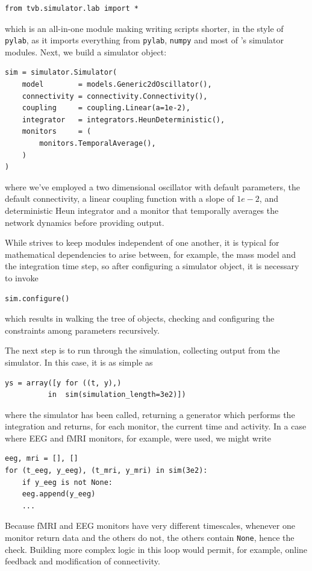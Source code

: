 \begin{lstlisting}
from tvb.simulator.lab import *
\end{lstlisting}

\noindent which is an all-in-one module making writing scripts
shorter, in the style of \texttt{pylab}, as it imports everything
from \texttt{pylab}, \texttt{numpy} and most of \TVB's simulator
modules. Next, we build a simulator object:

\begin{lstlisting}
sim = simulator.Simulator(
    model        = models.Generic2dOscillator(), 
    connectivity = connectivity.Connectivity(),
    coupling     = coupling.Linear(a=1e-2),
    integrator   = integrators.HeunDeterministic(),
    monitors     = (
        monitors.TemporalAverage(), 
    )
)
\end{lstlisting}

\noindent where we've employed a two dimensional oscillator
with default parameters, the default connectivity, a linear 
coupling function with a slope of $1e-2$, and deterministic
Heun integrator and a monitor that temporally averages the 
network dynamics before providing output.

While \TVB strives to keep modules independent of one another,
it is typical for mathematical dependencies to arise between, 
for example, the mass model and the integration time step, so
after configuring a simulator object, it is necessary to invoke

\begin{lstlisting}
sim.configure()
\end{lstlisting}

which results in walking the tree of objects, checking and 
configuring the constraints among parameters recursively.

The next step is to run through the simulation, collecting
output from the simulator. In this case, it is as simple as
\begin{lstlisting}
ys = array([y for ((t, y),) 
	      in  sim(simulation_length=3e2)])
\end{lstlisting}
\noindent where the simulator has been called, returning a 
generator which performs the integration and returns, for each
monitor, the current time and activity. In a case where EEG 
and fMRI monitors, for example, were used, we might write
\begin{lstlisting}
eeg, mri = [], []
for (t_eeg, y_eeg), (t_mri, y_mri) in sim(3e2):
    if y_eeg is not None:
	eeg.append(y_eeg)
    ...
\end{lstlisting}
\noindent Because fMRI and EEG monitors have very different
timescales, whenever one monitor return data and the others do
not, the others contain \texttt{None}, hence the check. Building
more complex logic in this loop would permit, for example, online
feedback and modification of connectivity. 


